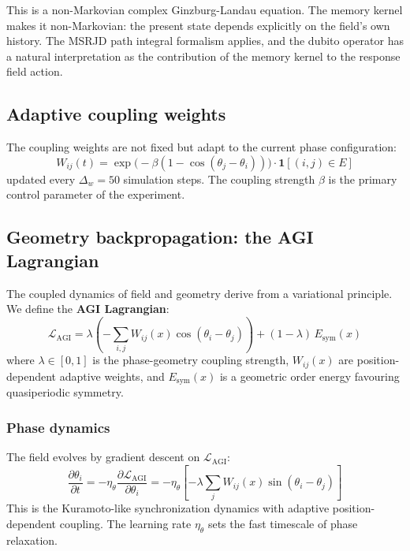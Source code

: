 \documentclass[12pt,a4paper]{article}
\theoremstyle{plain}
\theoremstyle{definition}
\begin{document}
This is a non-Markovian complex Ginzburg-Landau equation. The memory
kernel makes it non-Markovian: the present state depends explicitly on
the field's own history. The MSRJD path integral formalism
\citep{janssen1976,dedominicis1976} applies, and the dubito operator
has a natural interpretation as the contribution of the memory kernel
to the response field action.

\subsection{Adaptive coupling weights}

The coupling weights are not fixed but adapt to the current phase
configuration:
\begin{equation}
W_{ij}(t) = \exp\bigl(-\beta(1 - \cos(\theta_j - \theta_i))\bigr)
  \cdot \mathbf{1}[(i,j) \in E]
\end{equation}
updated every $\Delta_w = 50$ simulation steps. The coupling strength
$\beta$ is the primary control parameter of the experiment.

\subsection{Geometry backpropagation: the AGI Lagrangian}

The coupled dynamics of field and geometry derive from a variational
principle. We define the \textbf{AGI Lagrangian}:
\begin{equation}
\label{eq:lagrangian}
\mathcal{L}_{\text{AGI}} = \lambda \left(
  -\sum_{i,j} W_{ij}(x) \cos(\theta_i - \theta_j)
\right) + (1-\lambda)\, E_{\text{sym}}(x)
\end{equation}
where $\lambda \in [0,1]$ is the phase-geometry coupling strength,
$W_{ij}(x)$ are position-dependent adaptive weights, and $E_{\text{sym}}(x)$
is a geometric order energy favouring quasiperiodic symmetry.

\subsubsection{Phase dynamics}

The field evolves by gradient descent on $\mathcal{L}_{\text{AGI}}$:
\begin{equation}
\label{eq:phase_dynamics}
\frac{\partial \theta_i}{\partial t}
  = -\eta_\theta \frac{\partial \mathcal{L}_{\text{AGI}}}{\partial \theta_i}
  = -\eta_\theta \left[
      -\lambda \sum_j W_{ij}(x) \sin(\theta_i - \theta_j)
    \right]
\end{equation}
This is the Kuramoto-like synchronization dynamics with adaptive
position-dependent coupling. The learning rate $\eta_\theta$ sets the
fast timescale of phase relaxation.
\end{document}
